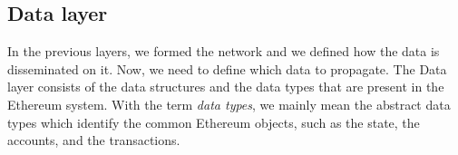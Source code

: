 \subsection{Data layer}

In the previous layers, we formed the network and we defined how the data is
disseminated on it. Now, we need to define which data to propagate. The Data
layer consists of the data structures and the data types that are present in the
Ethereum system. With the term \emph{data types}, we mainly mean the abstract
data types which identify the common Ethereum objects, such as the state, the
accounts, and the transactions.
